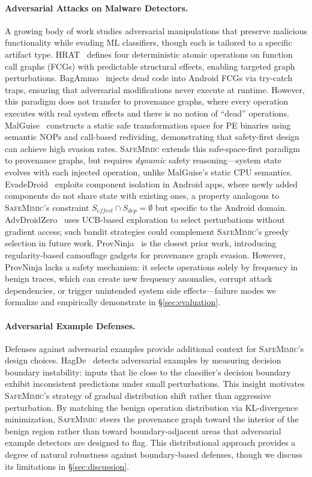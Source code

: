 \paragraph{Adversarial Attacks on Malware Detectors.}
A growing body of work studies adversarial manipulations that preserve malicious functionality while evading ML classifiers, though each is tailored to a specific artifact type.
HRAT~\cite{hrat} defines four deterministic atomic operations on function call graphs (FCGs) with predictable structural effects, enabling targeted graph perturbations.
BagAmmo~\cite{bagammo} injects dead code into Android FCGs via try-catch traps, ensuring that adversarial modifications never execute at runtime.
However, this paradigm does not transfer to provenance graphs, where every operation executes with real system effects and there is no notion of ``dead'' operations.
MalGuise~\cite{malguise} constructs a static safe transformation space for PE binaries using semantic NOPs and call-based redividing, demonstrating that safety-first design can achieve high evasion rates.
\textsc{SafeMimic} extends this safe-space-first paradigm to provenance graphs, but requires \emph{dynamic} safety reasoning---system state evolves with each injected operation, unlike MalGuise's static CPU semantics.
EvadeDroid~\cite{evadedroid} exploits component isolation in Android apps, where newly added components do not share state with existing ones, a property analogous to \textsc{SafeMimic}'s constraint $S_{\mathit{effect}} \cap S_{\mathit{dep}} = \emptyset$ but specific to the Android domain.
AdvDroidZero~\cite{advdroiedzero} uses UCB-based exploration to select perturbations without gradient access; such bandit strategies could complement \textsc{SafeMimic}'s greedy selection in future work.
ProvNinja~\cite{provninja} is the closest prior work, introducing regularity-based camouflage gadgets for provenance graph evasion.
However, ProvNinja lacks a safety mechanism: it selects operations solely by frequency in benign traces, which can create new frequency anomalies, corrupt attack dependencies, or trigger unintended system side effects---failure modes we formalize and empirically demonstrate in \S\ref{sec:evaluation}.

\paragraph{Adversarial Example Defenses.}
Defenses against adversarial examples provide additional context for \textsc{SafeMimic}'s design choices.
HagDe~\cite{hagde} detects adversarial examples by measuring decision boundary instability: inputs that lie close to the classifier's decision boundary exhibit inconsistent predictions under small perturbations.
This insight motivates \textsc{SafeMimic}'s strategy of gradual distribution shift rather than aggressive perturbation.
By matching the benign operation distribution via KL-divergence minimization, \textsc{SafeMimic} steers the provenance graph toward the interior of the benign region rather than toward boundary-adjacent areas that adversarial example detectors are designed to flag.
This distributional approach provides a degree of natural robustness against boundary-based defenses, though we discuss its limitations in \S\ref{sec:discussion}.
